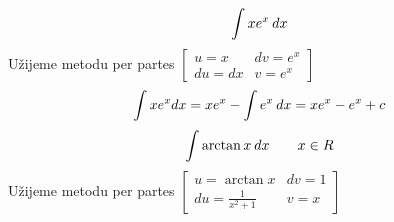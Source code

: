 \begin{mdframed}[style=mdexam]
  \begin{example}\label{mai:exam016}
    \begin{equation}\label{mai:exam016_001}
      \int{xe^x\hspace{2pt}dx}
    \end{equation}
    Užijeme metodu per partes 
      \(\left[\begin{array}{cc}
              u=x   & dv=e^x \\
              du=dx & v=e^x
        \end{array}\right]\) 
    \begin{equation*}
      \int{xe^xdx} = xe^x-\int{e^x\hspace{2pt}dx} = xe^x - e^x+ c
    \end{equation*}
    \begin{equation}\label{mai:exam016_002}
      \int{\arctan x\hspace{2pt}dx}\qquad x\in R
    \end{equation}
    Užijeme metodu per partes 
       \(\left[\begin{array}{cc} 
                u =\arctan x                     &  dv= 1  \\ 
               du =\displaystyle\frac{1}{x^2+1}  &   v= x
             \end{array}
       \right]\)
       

\end{example}
\end{mdframed}
